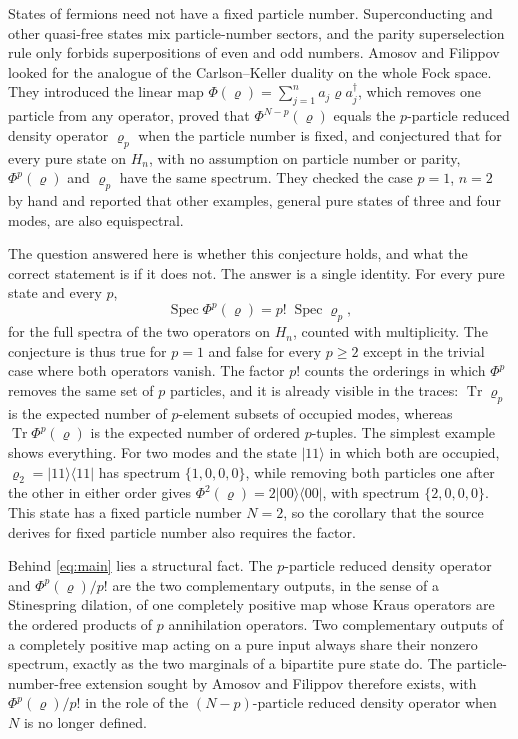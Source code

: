 \documentclass[11pt,a4paper]{article}
\theoremstyle{definition}
\theoremstyle{plain}
\DeclareMathOperator{\Tr}{Tr}
\DeclareMathOperator{\Spec}{Spec}
\newcommand{\ket}[1]{\lvert#1\rangle}
\newcommand{\bra}[1]{\langle#1\rvert}
\begin{document}
States of fermions need not have a fixed particle number. Superconducting and
other quasi-free states mix particle-number sectors, and the parity
superselection rule only forbids superpositions of even and odd numbers.
Amosov and Filippov \cite{AmosovFilippov2017} looked for the analogue of the
Carlson--Keller duality on the whole Fock space. They introduced the linear
map $\Phi(\varrho)=\sum_{j=1}^n a_j\varrho a_j^\dagger$, which removes one
particle from any operator, proved that $\Phi^{N-p}(\varrho)$ equals the
$p$-particle reduced density operator $\varrho_p$ when the particle number is
fixed, and conjectured that for every pure state on $H_n$, with no assumption
on particle number or parity, $\Phi^p(\varrho)$ and $\varrho_p$ have the same
spectrum. They checked the case $p=1$, $n=2$ by hand and reported that other
examples, general pure states of three and four modes, are also
equispectral.

The question answered here is whether this conjecture holds, and what the
correct statement is if it does not. The answer is a single identity. For
every pure state and every $p$,
\begin{equation}\label{eq:main}
\Spec\Phi^p(\varrho)=p!\;\Spec\varrho_p ,
\end{equation}
for the full spectra of the two operators on $H_n$, counted with
multiplicity. The conjecture is thus true for $p=1$ and false for every
$p\ge2$ except in the trivial case where both operators vanish. The factor
$p!$ counts the orderings in which $\Phi^p$ removes the same set of $p$
particles, and it is already visible in the traces: $\Tr\varrho_p$ is the
expected number of $p$-element subsets of occupied modes, whereas
$\Tr\Phi^p(\varrho)$ is the expected number of ordered $p$-tuples. The
simplest example shows everything. For two modes and the state $\ket{11}$ in
which both are occupied, $\varrho_2=\ket{11}\bra{11}$ has spectrum
$\{1,0,0,0\}$, while removing both particles one after the other in either
order gives $\Phi^2(\varrho)=2\ket{00}\bra{00}$, with spectrum $\{2,0,0,0\}$.
This state has a fixed particle number $N=2$, so the corollary that the
source derives for fixed particle number also requires the factor.

Behind \eqref{eq:main} lies a structural fact. The $p$-particle reduced
density operator and $\Phi^p(\varrho)/p!$ are the two complementary outputs,
in the sense of a Stinespring dilation, of one completely positive map whose
Kraus operators are the ordered products of $p$ annihilation operators. Two
complementary outputs of a completely positive map acting on a pure input
always share their nonzero spectrum, exactly as the two marginals of a
bipartite pure state do. The particle-number-free extension sought by Amosov
and Filippov therefore exists, with $\Phi^p(\varrho)/p!$ in the role of the
$(N-p)$-particle reduced density operator when $N$ is no longer defined.
\end{document}
